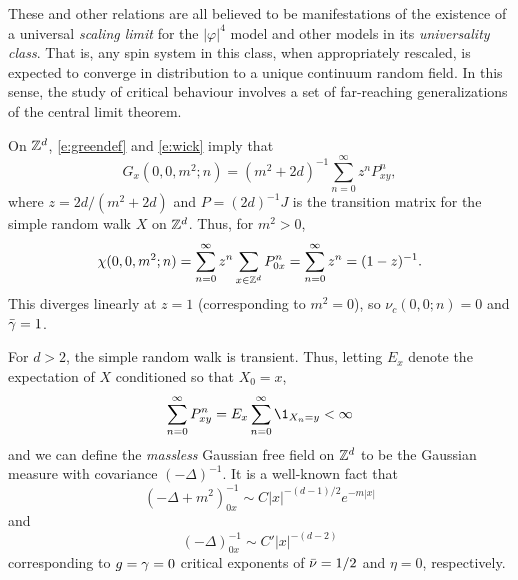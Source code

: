 These and other relations are all believed to be manifestations of the existence of
a universal \emph{scaling limit} for the $|\varphi|^4$ model and other models in its
\emph{universality class}. That is, any spin system in this class, when appropriately
rescaled, is expected to converge in distribution to a unique continuum random field.
In this sense, the study of critical behaviour involves a set of far-reaching
generalizations of the central limit theorem.

\begin{example}
\label{ex:gff-asymp}
On ${ {{\mathbb Z}}^d }$, \eqref{e:greendef} and \eqref{e:wick} imply that
\begin{equation}
G_x(0, 0, m^2; n)
	=
(m^2 + 2 d)^{-1} \sum_{n=0}^\infty z^n P^n_{xy},
\end{equation}
where $z = 2 d / (m^2 + 2 d)$ and $P = (2 d)^{-1} J$
is the transition matrix for the simple random walk $X$ on ${ {{\mathbb Z}}^d }$.
Thus, for $m^2 > 0$,
\begin{equation}
\chi(0, 0, m^2; n)
  =
\sum_{n=0}^\infty z^n \sum_{x\in{ {{\mathbb Z}}^d }} P^n_{0x}
  =
\sum_{n=0}^\infty z^n
  =
(1 - z)^{-1}.
\end{equation}
This diverges linearly at $z = 1$ (corresponding to $m^2 = 0$),
so $\nu_c(0, 0; n) = 0$ and $\bar\gamma = 1$.

For $d > 2$, the simple random walk is transient. Thus, letting $E_x$ denote the expectation
of $X$ conditioned so that $X_0 = x$,
\begin{equation}
\sum_{n=0}^\infty P^n_{xy} = E_x \sum_{n=0}^\infty \1_{X_n=y} < \infty
\end{equation}
and we can define the \emph{massless} Gaussian free field on ${ {{\mathbb Z}}^d }$ to be the Gaussian
measure with covariance $(-\Delta)^{-1}$. It is a well-known fact that
\begin{equation}
(-\Delta + m^2)^{-1}_{0x} \sim C |x|^{-(d-1)/2} e^{-m |x|}
\end{equation}
and
\begin{equation}
(-\Delta)^{-1}_{0x} \sim C' |x|^{-(d-2)}
\end{equation}
corresponding to $g = \gamma = 0$ critical exponents of $\bar\nu = 1/2$
and $\eta = 0$, respectively.
\end{example}

